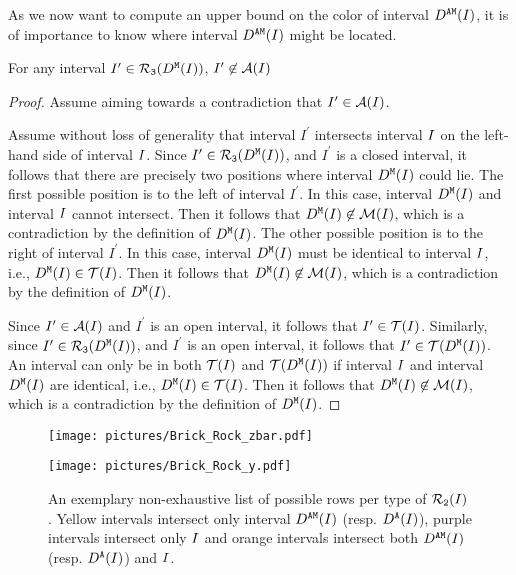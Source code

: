 {%
As we now want to compute an upper bound on the color of interval $D^\texttt{AM}(I)$, it is of importance to know where interval $D^\texttt{AM}(I)$ might be located.

\begin{lemma}
    \label{lem:zbar_not_in_LMR}
    For any interval $I^\prime \in \mathcal{R}_\texttt{3}(D^\texttt{M}(I))$, $I^\prime \not \in \mathcal{A}(I)$
\end{lemma}

\begin{proof}
    Assume aiming towards a contradiction that $I^\prime \in \mathcal{A}(I)$.
    \medskip

    Assume without loss of generality that interval $I^\prime$ intersects interval $I$ on the left-hand side of interval $I$.
    Since $I^\prime \in \mathcal{R}_\texttt{3}(D^\texttt{M}(I))$, and $I^\prime$ is a closed interval, it follows that there are precisely two positions where interval $D^\texttt{M}(I)$ could lie.
    The first possible position is to the left of interval $I^\prime$.
    In this case, interval $D^\texttt{M}(I)$ and interval $I$ cannot intersect.
    Then it follows that $D^\texttt{M}(I) \not \in \mathcal{M}(I)$, which is a contradiction by the definition of $D^\texttt{M}(I)$.
    The other possible position is to the right of interval $I^\prime$.
    In this case, interval $D^\texttt{M}(I)$ must be identical to interval $I$, i.e., $D^\texttt{M}(I) \in \mathcal{T}(I)$.
    Then it follows that $D^\texttt{M}(I) \not \in \mathcal{M}(I)$, which is a contradiction by the definition of $D^\texttt{M}(I)$.
    
    \medskip
    
    Since $I^\prime \in \mathcal{A}(I)$ and $I^\prime$ is an open interval, it follows that $I^\prime \in \mathcal{T}(I)$.
    Similarly, since $I^\prime \in \mathcal{R}_\texttt{3}(D^\texttt{M}(I))$, and $I^\prime$ is an open interval, it follows that $I^\prime \in \mathcal{T}(D^\texttt{M}(I))$.
    An interval can only be in both $\mathcal{T}(I)$ and $\mathcal{T}(D^\texttt{M}(I))$ if interval $I$ and interval $D^\texttt{M}(I)$ are identical, i.e., $D^\texttt{M}(I) \in \mathcal{T}(I)$.
    Then it follows that $D^\texttt{M}(I) \not \in \mathcal{M}(I)$, which is a contradiction by the definition of $D^\texttt{M}(I)$.
\end{proof}

\begin{figure}%
\centering
\begin{minipage}{0.49\textwidth}
\centering
\texttt{[image: pictures/Brick\_Rock\_zbar.pdf]}
\end{minipage}%
\hspace{0.01\textwidth}%
\begin{minipage}{0.49\textwidth}
\centering
\texttt{[image: pictures/Brick\_Rock\_y.pdf]}
\end{minipage}%
\caption{
An exemplary non-exhaustive list of possible rows per type of $\mathcal{R}_\texttt{2}(I)$.
Yellow intervals intersect only interval $D^\texttt{AM}(I)$ (resp. $D^\texttt{A}(I)$), purple intervals intersect only $I$ and orange intervals intersect both $D^\texttt{AM}(I)$ (resp. $D^\texttt{A}(I)$) and $I$.}
\label{fig:y_intersections}
\end{figure}

}

